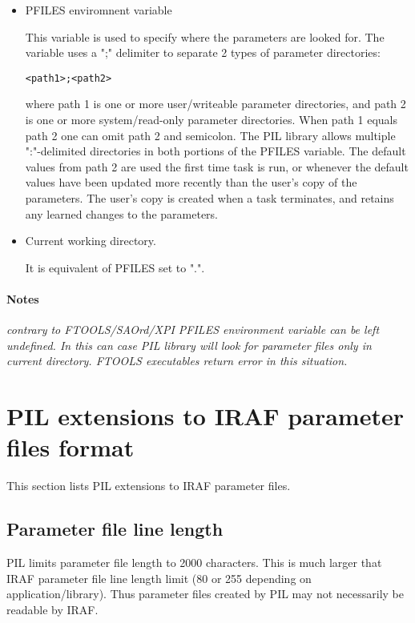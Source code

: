 \begin{itemize}
\item
PFILES enviromnent variable 

This variable is used to specify where the parameters are looked for. The
variable uses a ";" delimiter to
separate 2 types of parameter directories: 

\begin{verbatim}
<path1>;<path2>
\end{verbatim}

where path 1 is one or more user/writeable parameter directories, and
path 2 is one or more system/read-only parameter directories. When
path 1 equals path 2 one can omit path 2 and semicolon. The PIL library
allows multiple ":"-delimited directories in both portions of the
PFILES variable. The default values from path 2 are used the first
time task is run, or whenever the default values have been
updated more recently than the user's copy of the parameters. The user's
copy is created when a task terminates, and retains any learned
changes to the parameters. 

\item
Current working directory.

It is equivalent of PFILES set to ".". 
\end{itemize}

\paragraph{Notes\\}
{\it
contrary to FTOOLS/SAOrd/XPI PFILES environment variable can be left
undefined. In this can case PIL
library will look for parameter files only in current directory. FTOOLS
executables return error in this situation. 
}


\section{PIL extensions to IRAF parameter files format}\label{PILRefExtensions}

This section lists PIL extensions to IRAF parameter files.

\subsection{Parameter file line length}\label{PILRefLineLength}

PIL limits parameter file length to 2000 characters. This is much larger
that IRAF parameter file line length limit (80 or 255 depending on
application/library). Thus parameter files created by PIL may not
necessarily be readable by IRAF.

